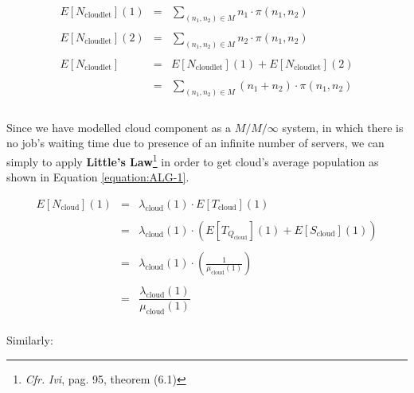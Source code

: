 \documentclass[10pt,a4paper]{article}
\begin{document}
\begin{equation}
\begin{array} {rcl} 
E[N_{\text{cloudlet}}](1) & = & \displaystyle \sum_{ (n_1, n_2) \in M} n_1 \cdot \pi(n_1,n_2) \\\\

E[N_{\text{cloudlet}}](2) & = & \displaystyle \sum_{ (n_1, n_2) \in M} n_2 \cdot \pi(n_1,n_2) \\\\

E[N_{\text{cloudlet}}] & = & E[N_{\text{cloudlet}}](1) + E[N_{\text{cloudlet}}](2) \\\\

& = & \displaystyle \sum_{ (n_1, n_2) \in M} (n_1 + n_2) \cdot \pi(n_1,n_2) \\\\

\end{array}
\end{equation}

Since we have modelled cloud component as a $M/M/\infty$ system, in which there is no job's waiting time due to presence of an infinite number of servers, we can simply to apply \textbf{Little’s Law}\footnote{\textit{Cfr.} \textit{Ivi}, pag. 95, theorem (6.1)} in order to get cloud's average population as shown in Equation \ref{equation:ALG-1}.

\begin{equation}
\label{equation:ALG-1}
\begin{array} {rcl} 
E[N_{\text{cloud}}](1) & = & \lambda_{\text{cloud}}(1) \cdot E[T_{\text{cloud}}](1)  \\\\

& = & \lambda_{\text{cloud}}(1) \cdot (E[T_{Q_{\text{cloud}}}](1) + E[S_{\text{cloud}}](1))  \\\\

& = & \lambda_{\text{cloud}}(1) \cdot (\frac{1}{\mu_{\text{cloud}}(1)}) \\\\

& = & \dfrac{\lambda_{\text{cloud}}(1)}{\mu_{\text{cloud}}(1)} \\

\end{array}
\end{equation}

Similarly:
 
\end{document}
